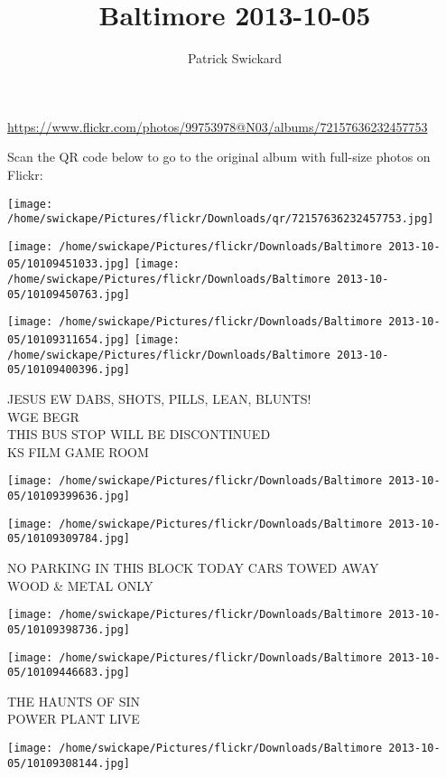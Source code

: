 \documentclass[10pt,letterpaper]{article}
\title{Baltimore 2013-10-05}
\author{Patrick Swickard}
\date{}
\begin{document}
\maketitle

\url{https://www.flickr.com/photos/99753978@N03/albums/72157636232457753}

Scan the QR code below to go to the original album with full-size photos on Flickr:

\texttt{[image: /home/swickape/Pictures/flickr/Downloads/qr/72157636232457753.jpg]}
\pagebreak

\texttt{[image: /home/swickape/Pictures/flickr/Downloads/Baltimore 2013-10-05/10109451033.jpg]}
\texttt{[image: /home/swickape/Pictures/flickr/Downloads/Baltimore 2013-10-05/10109450763.jpg]}

\texttt{[image: /home/swickape/Pictures/flickr/Downloads/Baltimore 2013-10-05/10109311654.jpg]}
\texttt{[image: /home/swickape/Pictures/flickr/Downloads/Baltimore 2013-10-05/10109400396.jpg]}

JESUS EW DABS, SHOTS, PILLS, LEAN, BLUNTS!\\
WGE BEGR\\
THIS BUS STOP WILL BE DISCONTINUED\\
KS FILM GAME ROOM
\pagebreak

\texttt{[image: /home/swickape/Pictures/flickr/Downloads/Baltimore 2013-10-05/10109399636.jpg]}

\vspace{0.25in}
\texttt{[image: /home/swickape/Pictures/flickr/Downloads/Baltimore 2013-10-05/10109309784.jpg]}

NO PARKING IN THIS BLOCK TODAY CARS TOWED AWAY\\
WOOD \& METAL ONLY
\pagebreak

\texttt{[image: /home/swickape/Pictures/flickr/Downloads/Baltimore 2013-10-05/10109398736.jpg]}

\vspace{0.25in}
\texttt{[image: /home/swickape/Pictures/flickr/Downloads/Baltimore 2013-10-05/10109446683.jpg]}

THE HAUNTS OF SIN\\
POWER PLANT LIVE
\pagebreak

\texttt{[image: /home/swickape/Pictures/flickr/Downloads/Baltimore 2013-10-05/10109308144.jpg]}
\end{document}
